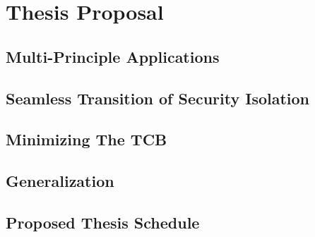 \chapter{Thesis Proposal}

\section{Multi-Principle Applications}

\section{Seamless Transition of Security Isolation}

\section{Minimizing The TCB}

\section{Generalization}

\section{Proposed Thesis Schedule}